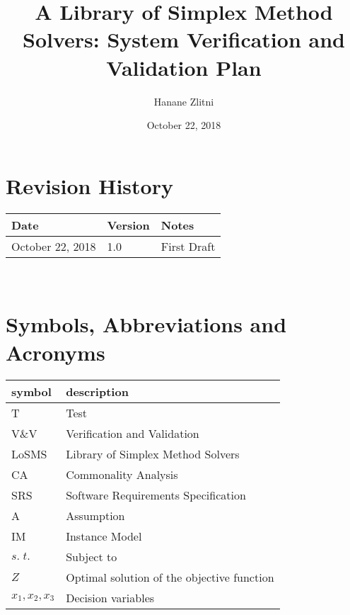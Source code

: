 \documentclass[12pt, titlepage]{article}
\newcommand{\famname}{LoSMS} %
\begin{document}
\title{A Library of Simplex Method Solvers: System Verification and Validation 
Plan } 
\author{Hanane Zlitni}
\date{October 22, 2018}
	
\maketitle


\section{Revision History}

\begin{tabularx}{\textwidth}{p{3cm}p{2cm}X}
\toprule {\bf Date} & {\bf Version} & {\bf Notes}\\
\midrule
October 22, 2018 & 1.0 & First Draft\\
\bottomrule
\end{tabularx}

~\newpage

\section{Symbols, Abbreviations and Acronyms}

\renewcommand{\arraystretch}{1.2}
\begin{tabular}{l l} 
  \toprule		
  \textbf{symbol} & \textbf{description}\\
  \midrule 
  T & Test\\
  V\&V & Verification and Validation\\
  \famname{} & Library of Simplex Method Solvers\\
  CA & Commonality Analysis\\
  SRS & Software Requirements Specification\\
  A & Assumption\\
  IM & Instance Model\\
  $s.\;t.$ & Subject to\\
  $Z$ & Optimal solution of the objective function\\
  $x_1, x_2, x_3$ & Decision variables\\
  \bottomrule
\end{tabular}\\

\newpage

\tableofcontents

\listoftables
\end{document}
